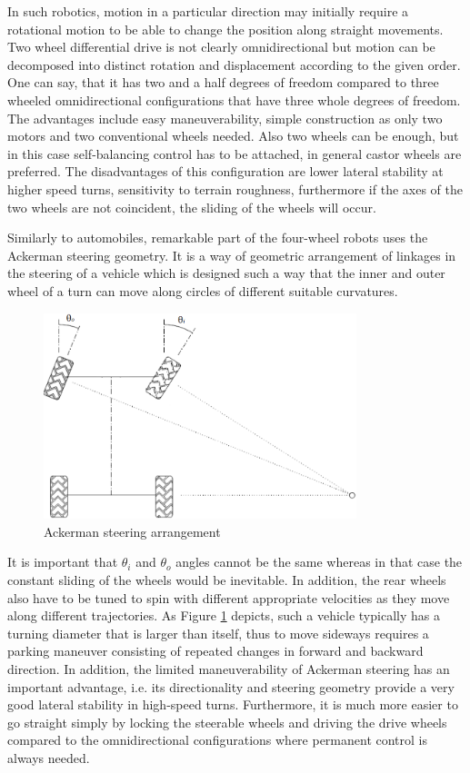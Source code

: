 \documentclass[12pt,english,twoside]{article}
\begin{document}
In such robotics, motion in a particular direction may initially require a rotational motion to be able to change the position along straight movements. Two wheel differential drive is not clearly omnidirectional but motion can be decomposed 
into distinct rotation and displacement according to the given order. One can say, that it has two and a half degrees of freedom compared to three wheeled omnidirectional configurations that have three whole degrees of freedom.
The advantages include easy maneuverability, simple construction as only two motors and two conventional wheels needed. Also two wheels can be enough, but in this case self-balancing control has to be attached, in general castor wheels are preferred. The disadvantages of this configuration are lower lateral stability at higher speed turns, sensitivity to terrain roughness, furthermore if the axes of the two wheels are not coincident, the sliding of the wheels will occur. \cite{rirt}

Similarly to automobiles, remarkable part of the four-wheel robots uses the Ackerman steering geometry. It is a way of geometric arrangement of linkages in the steering of a vehicle  which is designed such a way that the inner and outer wheel of a turn can move along circles of different suitable curvatures. 
\begin{figure}[htb!]
	\centering
	\includegraphics[height=6cm]{figures/ackerman2.png}
	\caption{Ackerman steering arrangement \cite{rirt}}
	\label{ackerman2}
\end{figure}
It is important that ${\theta}_i$ and ${\theta}_o$ angles cannot be the same whereas in that case the constant sliding of the wheels would be inevitable. In addition, the rear wheels also have to be tuned to spin with different appropriate velocities as they move along different trajectories. As Figure \ref{ackerman2} depicts, such a vehicle typically has a turning diameter that is larger than itself, thus to move sideways requires a parking maneuver consisting of repeated changes in forward and backward direction. In addition, the limited maneuverability of Ackerman steering has an important advantage, i.e. its directionality and steering geometry provide a
very good lateral stability in high-speed turns. Furthermore, it is much more easier to go straight simply by locking the steerable wheels and driving the drive wheels compared to the omnidirectional configurations where permanent control is always needed. \cite{rirt} \cite{sieg}
\end{document}
